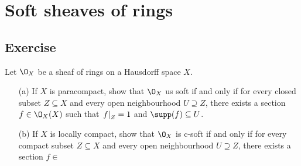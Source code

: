 \documentclass[../main.tex]{subfiles}
\begin{document}
\chapter{Soft sheaves of rings}



\section*{Exercise}

\begin{exe} Let $\O_X$ be a sheaf of rings on a Hausdorff space $X$.
\begin{enumerate}
    \item[(a)] If $X$ is paracompact, show that $\O_X$ us soft if and only if for every closed subset $Z\subseteq X$ and every open neighbourhood $U\supseteq Z$, there exists a section $f\in \O_X(X)$ such that $\left.f\right|_{Z} = 1$ and $\supp(f)\subseteq U$. 
    \item[(b)] If $X$ is locally compact, show that $\O_X$ is c-soft if and only if for every compact subset $Z\subseteq X$ and every open neighbourhood $U\supseteq Z$, there exists a section $f\in $
\end{enumerate}

\end{exe}
\end{document}
